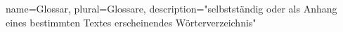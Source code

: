 {
    name=Glossar,
    plural=Glossare,
    description={"selbstständig oder als Anhang eines bestimmten Textes erscheinendes Wörterverzeichnis" \cite{Duden}}
}